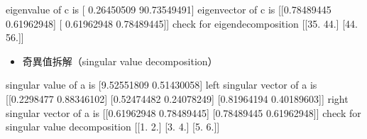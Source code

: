 \documentclass[letterpaper,10pt,english]{sphinxmanual}
\begin{document}
\begin{sphinxVerbatim}[commandchars=\\\{\}]
eigenvalue of c is 
 [ 0.26450509 90.73549491]
eigenvector of c is 
 [[\PYGZhy{}0.78489445  0.61962948]
 [ 0.61962948  0.78489445]]
check for eigen\PYGZhy{}decomposition 
 [[35. 44.]
 [44. 56.]]
\end{sphinxVerbatim}
\begin{itemize}
\item {} 
奇異值拆解（singular value decomposition）

\end{itemize}

\begin{sphinxVerbatim}[commandchars=\\\{\}]
      
         
         
\end{sphinxVerbatim}

\begin{sphinxVerbatim}[commandchars=\\\{\}]
singular value of a is 
 [9.52551809 0.51430058]
left singular vector of a is 
 [[\PYGZhy{}0.2298477   0.88346102]
 [\PYGZhy{}0.52474482  0.24078249]
 [\PYGZhy{}0.81964194 \PYGZhy{}0.40189603]]
right singular vector of a is 
 [[\PYGZhy{}0.61962948 \PYGZhy{}0.78489445]
 [\PYGZhy{}0.78489445  0.61962948]]
check for singular value decomposition 
 [[1. 2.]
 [3. 4.]
 [5. 6.]]
\end{sphinxVerbatim}
\end{document}
